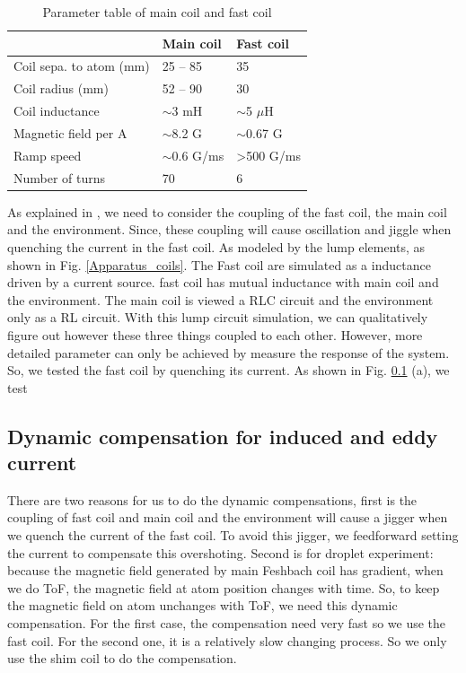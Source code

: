 \begin{table}[htbp]
\centering
\begin{tabular}{|l|l|l|}
\hline
                        & Main coil      & Fast coil             \\ \hline
Coil sepa. to atom (mm) & 25 – 85        & 35                    \\ \hline
Coil radius (mm)        & 52 – 90        & 30                    \\ \hline
Coil inductance         & $\sim$3 mH     & $\sim$5 $\mu$H        \\ \hline
Magnetic field per A    & $\sim$8.2 G    & $\sim$0.67 G          \\ \hline
Ramp speed              & $\sim$0.6 G/ms & \textgreater{}500 G/ms\\ \hline
Number of turns         & 70             & 6                     \\ \hline
\end{tabular}
\caption[Parameter table of main coil and fast coil]{Parameter table of main coil and fast coil}
\label{tab:coils}
\end{table}

As explained in \cite{cumby2012exploring}, we need to consider the coupling of the fast coil, the main coil and the environment. Since, these coupling will cause oscillation and jiggle when quenching the current in the fast coil. As modeled by the lump elements, as shown in Fig. \ref{Apparatus_coils}. The Fast coil are simulated as a inductance driven by a current source. fast coil has mutual inductance with main coil and the environment. The main coil is viewed a RLC circuit and the environment only as a RL circuit. With this lump circuit simulation, we can qualitatively figure out however these three things coupled to each other. However, more detailed parameter can only be achieved by measure the response of the system. So, we tested the fast coil by quenching its current. As shown in Fig. \ref{} (a), we test 



\subsection{Dynamic compensation for induced and eddy current}

There are two reasons for us to do the dynamic compensations, first is the coupling of fast coil and main coil and the environment will cause a jigger when we quench the current of the fast coil. To avoid this jigger, we feedforward setting the current to compensate this overshoting. Second is for droplet experiment: because the magnetic field generated by main Feshbach coil has gradient, when we do ToF, the magnetic field at atom position changes with time. So, to keep the magnetic field on atom unchanges with ToF, we need this dynamic compensation. For the first case, the compensation need very fast so we use the fast coil. For the second one, it is a relatively slow changing process. So we only use the shim coil to do the compensation. 




